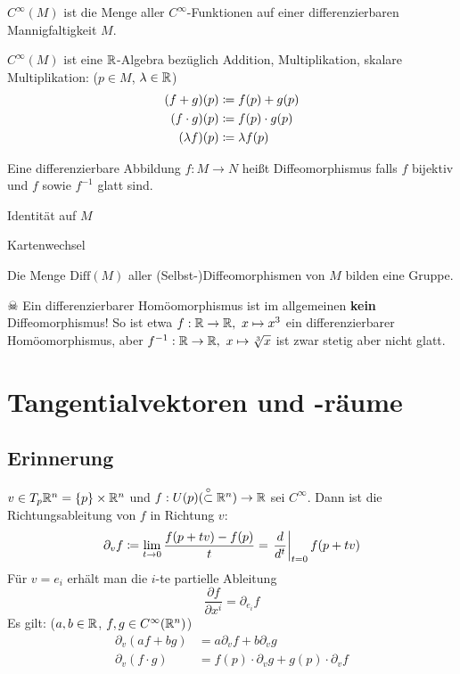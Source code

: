 \documentclass[a4paper,twoside,DIV15,BCOR12mm]{scrbook}
\newcommand{\otm}{\stackrel{\circ}{\subset}} %
\begin{document}
\begin{definition}
$C^\infty(M)$ ist die Menge aller $C^\infty$-Funktionen auf einer differenzierbaren Mannigfaltigkeit $M$.
\end{definition}

\begin{bemerkung}
$C^{\infty}(M)$ ist eine $\mathbb{R}$-Algebra bezüglich Addition, Multiplikation, skalare Multiplikation: ($p\in M$, $\lambda \in \mathbb{R}$)
\begin{align*}
(f+g)(p) &\da f(p) + g(p)   \\
(f\cdot g)(p) &\da f(p) \cdot g(p)  \\
(\lambda f)(p) &\da \lambda f(p) \\
\end{align*}
\end{bemerkung}

\begin{definition}[Diffeomorphismus]
Eine differenzierbare Abbildung $f:M\to N$ heißt Diffeomorphismus falls $f$ bijektiv und $f$ sowie $f^{-1}$ glatt sind.
\end{definition}

\begin{beispiele}
\item Identität auf $M$
\item Kartenwechsel
\end{beispiele}

Die Menge $\text{Diff}(M)$ aller (Selbst-)Diffeomorphismen von $M$ bilden eine Gruppe.


$\skull$
Ein differenzierbarer Homöomorphismus ist im allgemeinen \textbf{kein} Diffeomorphismus! So ist etwa $f:\mathbb{R}\to\mathbb{R},\ x\mapsto x^3$ ein differenzierbarer Homöomorphismus, aber $f^{-1} :\MdR \to \MdR, \ x\mapsto\sqrt[3]{x}$ ist zwar stetig aber nicht glatt.

\section{Tangentialvektoren und -räume}

\subsection*{Erinnerung}
$v \in T_p\mathbb{R}^n = \{p\} \times \mathbb{R}^n$ und $f:U(p) (\otm \MdR^n) \to \MdR$ sei $C^\infty$. Dann ist die Richtungsableitung von $f$ in Richtung $v$:
\[
\partial_vf \da  \lim_{t\to0} \frac{f(p+tv) - f(p)}{t} = \left.\frac{d}{d^t}\right|_{t=0} f(p+tv)
\]
Für $v=e_i$ erhält man die $i$-te partielle Ableitung
\[ \frac{\partial f}{\partial x^i} = \partial_{e_i} f \]
Es gilt: ($a,b\in\mathbb{R}$, $f,g\in C^\infty(\mathbb{R}^n)$)
\begin{align*}
\partial_v(af + bg) &= a\partial_v f+ b\partial_v g \\
\partial_v(f \cdot g) &= f(p)\cdot\partial_v g+ g(p)\cdot\partial_v f
\end{align*}
\end{document}
